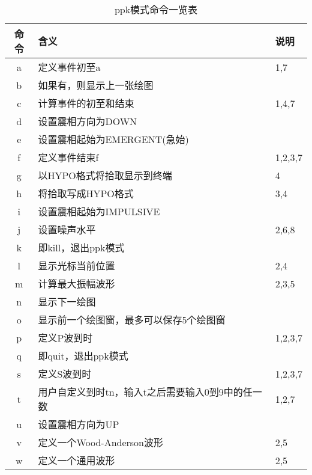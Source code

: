 \begin{table}[H]
\centering
\small
\ttfamily
\caption{ppk模式命令一览表}
\label{table:plotpk-commands}
\begin{tabular}{cll}
	\toprule
    命令	&	含义	                                &   说明    \\
	\midrule
    a	    &	定义事件初至a                           &   1,7	    \\
    b	    &	如果有，则显示上一张绘图	            &           \\
    c	    &	计算事件的初至和结束                    &   1,4,7	\\
    d	    &	设置震相方向为DOWN	                    &           \\
    e     	&	设置震相起始为EMERGENT(急始)	        &           \\
    f	    &	定义事件结束f                           &  1,2,3,7	\\
    g	    &	以HYPO格式将拾取显示到终端              &   4   	\\
    h   	&	将拾取写成HYPO格式                      &   3,4 	\\
    i	    &	设置震相起始为IMPULSIVE	                &           \\
    j	    &	设置噪声水平                            &   2,6,8	\\
    k       &   即kill，退出ppk模式                     &           \\
    l	    &	显示光标当前位置                        &   2,4	    \\
    m	    &	计算最大振幅波形                        &   2,3,5	\\
    n	    &	显示下一绘图	                        &           \\
    o	    &	显示前一个绘图窗，最多可以保存5个绘图窗	&           \\
    p	    &	定义P波到时                             &   1,2,3,7	\\
    q	    &	即quit，退出ppk模式	                            &           \\
    s	    &	定义S波到时                             &   1,2,3,7 \\
    t	    &	用户自定义到时tn，输入t之后需要输入0到9中的任一数	&   1,2,7\\
    u	    &	设置震相方向为UP	                    &           \\
    v	    &	定义一个Wood-Anderson波形               &   2,5 	\\
    w	    &	定义一个通用波形                        &   2,5 	\\

\end{tabular}
\end{table}
